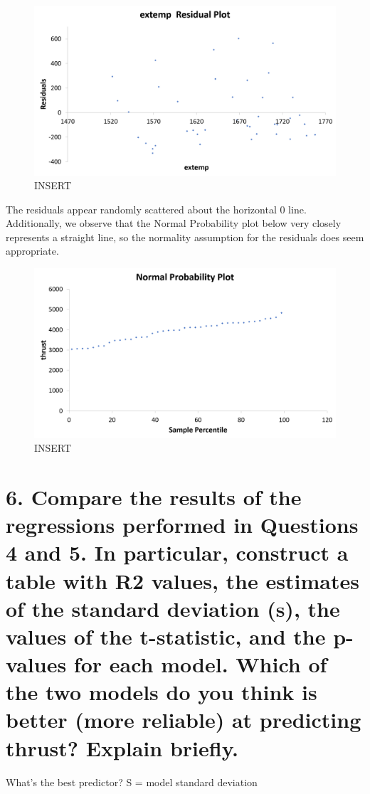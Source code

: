 \documentclass[letterpaper]{article}
\begin{document}
\begin{figure}[H]
 \centering
 \includegraphics[width=\textwidth]{extempresidual.png}
 \caption{INSERT}
\end{figure}
The residuals appear randomly scattered about the horizontal 0 line.
Additionally, we observe that the Normal Probability plot below
very closely represents a straight line, so the normality assumption for the
residuals does seem appropriate.

\begin{figure}[H]
 \centering
 \includegraphics[width=\textwidth]{normalplot2.png}
 \caption{INSERT}
\end{figure}

\section{6.	Compare the results of the regressions performed in Questions 4 and 5. In particular, construct a table with R2 values, the estimates of the standard deviation (s), the values of the t-statistic, and the p-values for each model. Which of the two models do you think is better (more reliable) at predicting thrust? Explain briefly.}
What’s the best predictor? S = model standard deviation
\end{document}
